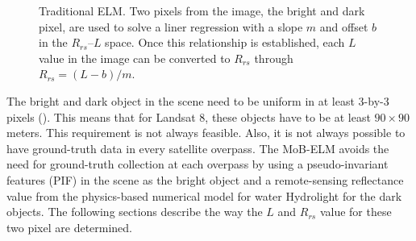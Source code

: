 \documentclass[onecolumn,3p]{elsarticle}
\begin{document}
\begin{figure}[htb]
	\centering
\caption{Traditional ELM. Two pixels from the image, the bright and dark pixel, are used to solve a liner regression with a slope $m$ and offset $b$ in the $R_{rs}$--$L$ space. Once this relationship is established, each $L$ value in the image can be converted to $R_{rs}$ through $R_{rs}=(L-b)/m$. \label{fig:ELMregression}}
\end{figure}

The bright and dark object in the scene need to be uniform in at least 3-by-3 pixels (\cite{Schott}). This means that for Landsat 8, these objects have to be at least $90\times 90$ meters. This requirement is not always feasible. Also, it is not always possible to have ground-truth data in every satellite overpass. The MoB-ELM avoids the need for ground-truth collection at each overpass by using a pseudo-invariant features (PIF) in the scene as the bright object and a remote-sensing reflectance value from the physics-based numerical model for water Hydrolight for the dark objects. The following sections describe the way the $L$ and $R_{rs}$ value for these two pixel are determined.
\end{document}
